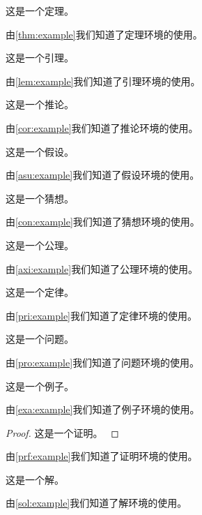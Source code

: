 \begin{theorem}
    这是一个定理。
    \label{thm:example}
\end{theorem}
由\cref{thm:example}我们知道了定理环境的使用。

\begin{lemma}
    这是一个引理。
    \label{lem:example}
\end{lemma}
由\cref{lem:example}我们知道了引理环境的使用。

\begin{corollary}
    这是一个推论。
    \label{cor:example}
\end{corollary}
由\cref{cor:example}我们知道了推论环境的使用。

\begin{assumption}
    这是一个假设。
    \label{asu:example}
\end{assumption}
由\cref{asu:example}我们知道了假设环境的使用。

\begin{conjecture}
    这是一个猜想。
    \label{con:example}
\end{conjecture}
由\cref{con:example}我们知道了猜想环境的使用。

\begin{axiom}
    这是一个公理。
    \label{axi:example}
\end{axiom}
由\cref{axi:example}我们知道了公理环境的使用。

\begin{principle}
    这是一个定律。
    \label{pri:example}
\end{principle}
由\cref{pri:example}我们知道了定律环境的使用。

\begin{problem}
    这是一个问题。
    \label{pro:example}
\end{problem}
由\cref{pro:example}我们知道了问题环境的使用。

\begin{example}
    这是一个例子。
    \label{exa:example}
\end{example}
由\cref{exa:example}我们知道了例子环境的使用。

\begin{proof}
    这是一个证明。
    \label{prf:example}
\end{proof}
由\cref{prf:example}我们知道了证明环境的使用。

\begin{solution}
    这是一个解。
    \label{sol:example}
\end{solution}
由\cref{sol:example}我们知道了解环境的使用。
